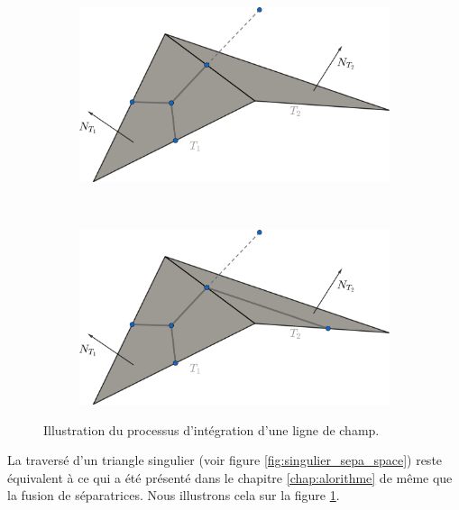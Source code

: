 \begin{figure}[h!]
\centering
\begin{subfigure}{0.65\textwidth}
    \includegraphics[width=\textwidth]{images/draw_sepa_space_1.pdf}
\end{subfigure}
\\[0.5cm]
\begin{subfigure}{0.65\textwidth}
    \includegraphics[width=\textwidth]{images/draw_sepa_space_2.pdf}
\end{subfigure}
\caption{Illustration du processus d'intégration d'une ligne de champ.}
\label{fig:draw_sepa_space}
\end{figure}

La traversé d'un triangle singulier (voir figure \ref{fig:singulier_sepa_space})  reste équivalent à ce qui a été présenté dans le chapitre \ref{chap:alorithme} de même que la fusion de séparatrices. Nous illustrons cela sur la figure \ref{fig:draw_sepa_space}.\\

